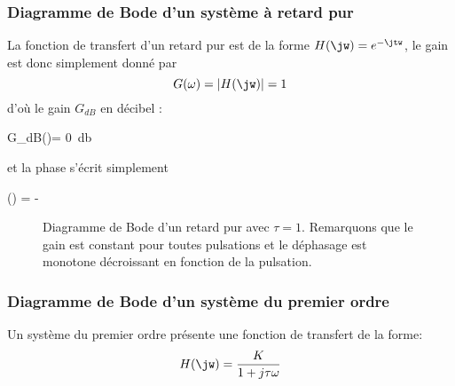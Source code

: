 \subsubsection{Diagramme de Bode d'un système à retard pur}
La fonction de transfert d'un retard pur est de la forme $H(\jw)=e^{-\jtw}$,
le gain est donc simplement donné par
$$
G(\omega)=|H(\jw)|=1
$$
d'où le gain $G_{dB}$ en décibel :
\begin{bequation}
    G_{dB}(\omega)= \SI{0}{\decibel}
\end{bequation}
et la phase s'écrit simplement
\begin{bequation}
    \phi(\omega) = -\tau\omega
\end{bequation}
\begin{figure}[!htb]
    \centering
    

    
    \caption{Diagramme de Bode d'un retard pur 
             avec $\tau=1$. Remarquons que le gain est constant pour toutes 
             pulsations et le déphasage est monotone décroissant en fonction 
             de la pulsation\label{fig-bode_retard_1}.}
\end{figure}
\subsubsection{Diagramme de Bode d'un système du premier ordre}
Un système du premier ordre présente une fonction de transfert de la forme:
\begin{align}
H(\jw)=\dfrac{K}{1+j\tau\omega }\label{eq-1er_ftjw}
\end{align}

